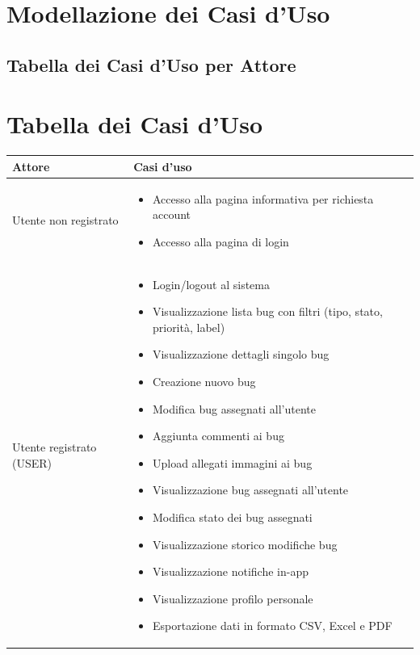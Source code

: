 ﻿\documentclass[a4paper,11pt]{article}
\begin{document}
\section{Modellazione dei Casi d'Uso}
\subsection{Tabella dei Casi d'Uso per Attore}

\section{Tabella dei Casi d'Uso}

\begin{longtable}{|p{3cm}|p{11cm}|}
\hline
\textbf{Attore} & \textbf{Casi d'uso} \\
\hline
Utente non registrato &
\begin{itemize}[nosep,leftmargin=*]
  \item Accesso alla pagina informativa per richiesta account
  \item Accesso alla pagina di login
\end{itemize} \\
\hline
Utente registrato (USER) &
\begin{itemize}[nosep,leftmargin=*]
  \item Login/logout al sistema
  \item Visualizzazione lista bug con filtri (tipo, stato, priorit\`a, label)
  \item Visualizzazione dettagli singolo bug
  \item Creazione nuovo bug
  \item Modifica bug assegnati all'utente
  \item Aggiunta commenti ai bug
  \item Upload allegati immagini ai bug
  \item Visualizzazione bug assegnati all'utente
  \item Modifica stato dei bug assegnati
  \item Visualizzazione storico modifiche bug
  \item Visualizzazione notifiche in-app
  \item Visualizzazione profilo personale
  \item Esportazione dati in formato CSV, Excel e PDF
\end{itemize} \\

\end{longtable}
\end{document}
